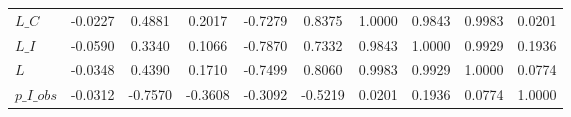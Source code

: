 \begin{center}
\begin{longtable}{lccccccccc}
$L\_C            $	 & 	           -0.0227	 & 	            0.4881	 & 	            0.2017	 & 	           -0.7279	 & 	            0.8375	 & 	            1.0000	 & 	            0.9843	 & 	            0.9983	 & 	            0.0201 \\ 
$L\_I            $	 & 	           -0.0590	 & 	            0.3340	 & 	            0.1066	 & 	           -0.7870	 & 	            0.7332	 & 	            0.9843	 & 	            1.0000	 & 	            0.9929	 & 	            0.1936 \\ 
$L               $	 & 	           -0.0348	 & 	            0.4390	 & 	            0.1710	 & 	           -0.7499	 & 	            0.8060	 & 	            0.9983	 & 	            0.9929	 & 	            1.0000	 & 	            0.0774 \\ 
$p\_I\_obs       $	 & 	           -0.0312	 & 	           -0.7570	 & 	           -0.3608	 & 	           -0.3092	 & 	           -0.5219	 & 	            0.0201	 & 	            0.1936	 & 	            0.0774	 & 	            1.0000 \\ 
\end{longtable}
 \end{center}
